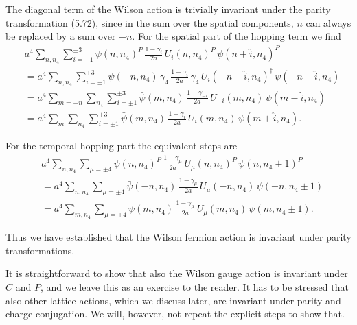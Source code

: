 The diagonal term of the Wilson action is trivially invariant under the
parity transformation (5.72), since in the sum over the spatial components, $n$
can always be replaced by a sum over $-n$. For the spatial part of the hopping
term we find
\begin{equation}
  \begin{aligned}
    &a^4\sum_{n,n_4}\sum_{i=\pm1}^{\pm3}\bar{\psi}(n,n_4)^P\,
      \frac{1-\gamma_i}{2a}\,U_i(n,n_4)^P\,\psi(n+\hat{i},n_4)^P\\
    &= a^4\sum_{n,n_4}\sum_{i=\pm1}^{\pm3}\bar{\psi}(-n,n_4)\,\gamma_4\,
      \frac{1-\gamma_i}{2a}\,\gamma_4\,U_i(-n-\hat{i},n_4)^\dagger\,
      \psi(-n-\hat{i},n_4)\\
    &= a^4\sum_{m=-n}\sum_{n_4}\sum_{i=\pm1}^{\pm3}\bar{\psi}(m,n_4)\,
      \frac{1-\gamma_{-i}}{2a}\,U_{-i}(m,n_4)\,\psi(m-\hat{i},n_4)\\
    &= a^4\sum_{m}\sum_{n_4}\sum_{i=\pm1}^{\pm3}\bar{\psi}(m,n_4)\,
      \frac{1-\gamma_i}{2a}\,U_i(m,n_4)\,\psi(m+\hat{i},n_4) .
  \end{aligned}
\end{equation}

For the temporal hopping part the equivalent steps are
\begin{equation}
  \begin{aligned}
    &a^4\sum_{n,n_4}\sum_{\mu=\pm4}\bar{\psi}(n,n_4)^P\,
      \frac{1-\gamma_\mu}{2a}\,U_\mu(n,n_4)^P\,\psi(n,n_4\pm1)^P\\
    &= a^4\sum_{n,n_4}\sum_{\mu=\pm4}\bar{\psi}(-n,n_4)\,
      \frac{1-\gamma_\mu}{2a}\,U_\mu(-n,n_4)\,\psi(-n,n_4\pm1)\\
    &= a^4\sum_{m,n_4}\sum_{\mu=\pm4}\bar{\psi}(m,n_4)\,
      \frac{1-\gamma_\mu}{2a}\,U_\mu(m,n_4)\,\psi(m,n_4\pm1) .
  \end{aligned}
\end{equation}

Thus we have established that the Wilson fermion action is invariant under
parity transformations.

It is straightforward to show that also the Wilson gauge action is invariant
under $C$ and $P$, and we leave this as an exercise to the reader. It has to be
stressed that also other lattice actions, which we discuss later, are invariant
under parity and charge conjugation. We will, however, not repeat the explicit
steps to show that.

